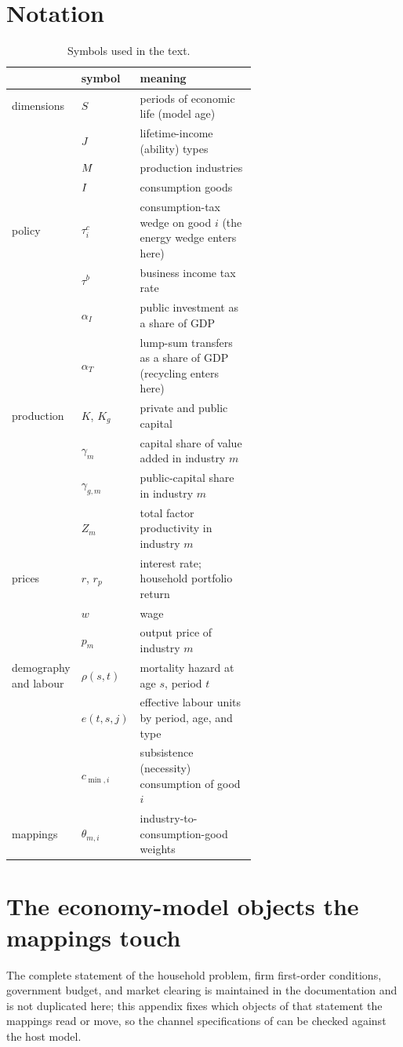 \section{Notation}
\label{app:notation}

\begin{table}[H]
\centering\footnotesize
\caption{Symbols used in the text.}
\begin{tabular}{@{}llp{0.62\linewidth}@{}}
\toprule
& symbol & meaning \\
\midrule
dimensions
& $S$ & periods of economic life (model age) \\
& $J$ & lifetime-income (ability) types \\
& $M$ & production industries \\
& $I$ & consumption goods \\
\addlinespace
policy
& $\tau^{c}_{i}$ & consumption-tax wedge on good $i$ (the energy wedge enters here) \\
& $\tau^{b}$ & business income tax rate \\
& $\alpha_I$ & public investment as a share of GDP \\
& $\alpha_T$ & lump-sum transfers as a share of GDP (recycling enters here) \\
\addlinespace
production
& $K$, $K_g$ & private and public capital \\
& $\gamma_m$ & capital share of value added in industry $m$ \\
& $\gamma_{g,m}$ & public-capital share in industry $m$ \\
& $Z_m$ & total factor productivity in industry $m$ \\
\addlinespace
prices
& $r$, $r_p$ & interest rate; household portfolio return \\
& $w$ & wage \\
& $p_m$ & output price of industry $m$ \\
\addlinespace
demography and labour
& $\rho(s,t)$ & mortality hazard at age $s$, period $t$ \\
& $e(t,s,j)$ & effective labour units by period, age, and type \\
& $c_{\min,i}$ & subsistence (necessity) consumption of good $i$ \\
\addlinespace
mappings
& $\theta_{m,i}$ & industry-to-consumption-good weights \\
\bottomrule
\end{tabular}
\end{table}

\section{The economy-model objects the mappings touch}
\label{app:og-equations}
The complete statement of the household problem, firm first-order conditions,
government budget, and market clearing is maintained in the \OGCore{} documentation
and is not duplicated here; this appendix fixes which objects of that statement the
mappings read or move, so the channel specifications of  can be
checked against the host model.

